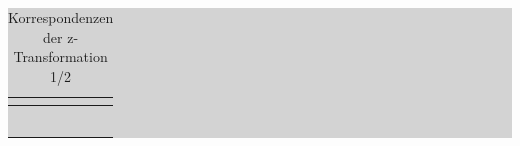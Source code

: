 \begin{table}[H]
\setlength{\arrayrulewidth}{.1em}
\caption{Korrespondenzen der z-Transformation 1/2}
\setlength{\fboxsep}{0pt}%
\colorbox{lightgray}{%
%
\begin{tabular}{| c | c | c | c |}
\hline
\parbox[c][0.3in][c]{0.3in}{\smallskip\centering\textbf{\selectfont{Nr}}} &
\parbox[c][0.5in][c]{2.4in}{\smallskip\centering\textbf{\selectfont{Zeitfunktion x(t)}}} & \parbox[c][0.5in][c]{1.2in}{\smallskip\centering\textbf{\selectfont{Konvergenz-\\bereich}}} &
\parbox[c][0.5in][c]{2.4in}{\smallskip\centering\textbf{\selectfont{Laplace-Transformierte X(s)}}}\\ \hline

\parbox[c][0.5in][c]{0.3in}{} &
\parbox[c][0.5in][c]{2.4in}{} & 
\parbox[c][0.5in][c]{1.2in}{} & 
\parbox[c][0.5in][c]{2.4in}{}\\
\hline

\parbox[c][0.5in][c]{0.3in}{} &
\parbox[c][0.5in][c]{2.4in}{} & 
\parbox[c][0.5in][c]{1.2in}{} & 
\parbox[c][0.5in][c]{2.4in}{}\\
\hline

\parbox[c][0.5in][c]{0.3in}{} &
\parbox[c][0.5in][c]{2.4in}{} & 
\parbox[c][0.5in][c]{1.2in}{} & 
\parbox[c][0.5in][c]{2.4in}{}\\
\hline

\parbox[c][0.5in][c]{0.3in}{} &
\parbox[c][0.5in][c]{2.4in}{} & 
\parbox[c][0.5in][c]{1.2in}{} & 
\parbox[c][0.5in][c]{2.4in}{}\\
\hline

\parbox[c][0.5in][c]{0.3in}{} &
\parbox[c][0.5in][c]{2.4in}{} & 
\parbox[c][0.5in][c]{1.2in}{} & 
\parbox[c][0.5in][c]{2.4in}{}\\
\hline

\parbox[c][0.5in][c]{0.3in}{} &
\parbox[c][0.5in][c]{2.4in}{} & 
\parbox[c][0.5in][c]{1.2in}{} & 
\parbox[c][0.5in][c]{2.4in}{}\\
\hline


\end{tabular}}
\end{table}

